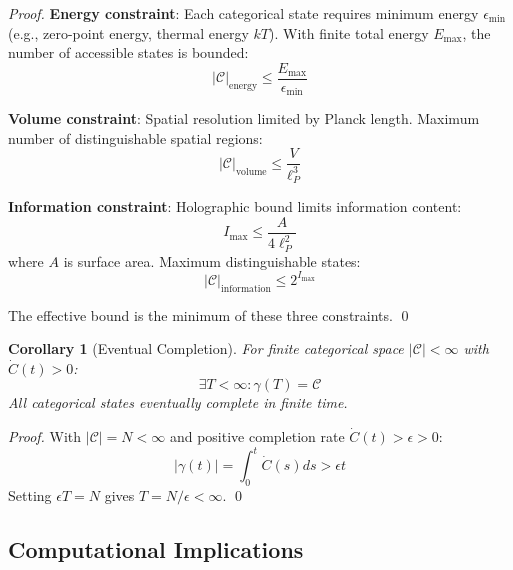 \documentclass[11pt]{article}
\newtheorem{corollary}[theorem]{Corollary}
\theoremstyle{remark}
\begin{document}
\begin{proof}
\textbf{Energy constraint}: Each categorical state requires minimum energy $\epsilon_{\text{min}}$ (e.g., zero-point energy, thermal energy $kT$). With finite total energy $E_{\text{max}}$, the number of accessible states is bounded:
\begin{equation}
|\mathcal{C}|_{\text{energy}} \leq \frac{E_{\text{max}}}{\epsilon_{\text{min}}}
\end{equation}

\textbf{Volume constraint}: Spatial resolution limited by Planck length. Maximum number of distinguishable spatial regions:
\begin{equation}
|\mathcal{C}|_{\text{volume}} \leq \frac{V}{\ell_P^3}
\end{equation}

\textbf{Information constraint}: Holographic bound limits information content:
\begin{equation}
I_{\text{max}} \leq \frac{A}{4\ell_P^2}
\end{equation}
where $A$ is surface area. Maximum distinguishable states:
\begin{equation}
|\mathcal{C}|_{\text{information}} \leq 2^{I_{\text{max}}}
\end{equation}

The effective bound is the minimum of these three constraints. \qed
\end{proof}

\begin{corollary}[Eventual Completion]
\label{cor:eventual_completion}
For finite categorical space $|\mathcal{C}| < \infty$ with $\dot{C}(t) > 0$:
\begin{equation}
\exists T < \infty: \gamma(T) = \mathcal{C}
\end{equation}
All categorical states eventually complete in finite time.
\end{corollary}

\begin{proof}
With $|\mathcal{C}| = N < \infty$ and positive completion rate $\dot{C}(t) > \epsilon > 0$:
\begin{equation}
|\gamma(t)| = \int_0^t \dot{C}(s) ds > \epsilon t
\end{equation}
Setting $\epsilon T = N$ gives $T = N/\epsilon < \infty$. \qed
\end{proof}

\subsection{Computational Implications}
\end{document}
